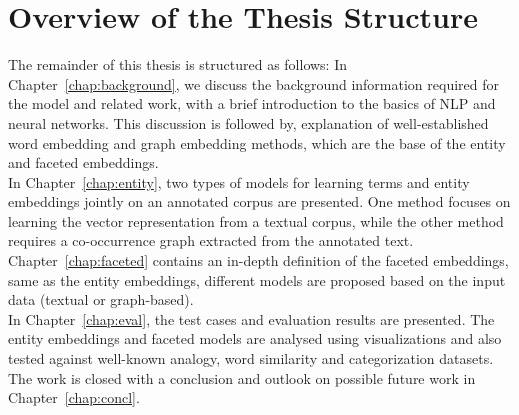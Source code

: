 \section{Overview of the Thesis Structure}
The remainder of this thesis is structured as follows: 
In Chapter~\ref{chap:background},  we discuss the background information required for the model and related work, with a brief introduction to the basics of NLP and neural networks. This discussion is followed by, explanation of well-established word embedding and graph embedding methods, which are the base of the entity and faceted embeddings.\\
 In Chapter~\ref{chap:entity}, two types of models for learning terms and entity embeddings jointly on an annotated corpus are presented. One method focuses on learning the vector representation from a textual corpus, while the other method requires a co-occurrence graph extracted from the annotated text.\\
Chapter~\ref{chap:faceted} contains an in-depth definition of the faceted embeddings, same as the entity embeddings, different models are proposed based on the input data (textual or graph-based). \\
In Chapter~\ref{chap:eval}, the test cases and evaluation results are presented. The entity embeddings and faceted models are analysed using visualizations and also tested against well-known analogy, word similarity and categorization datasets. \\
The work is closed with a conclusion and outlook on possible future work in Chapter~\ref{chap:concl}. 


